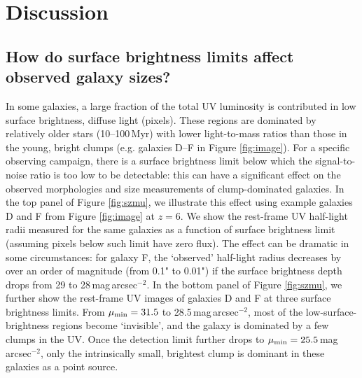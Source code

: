 \documentclass[useAMS,usenatbib]{mn2e}
\begin{document}
\section{Discussion}
\label{sec:discussion}

\subsection{How do surface brightness limits affect observed galaxy sizes?}
\label{sec:szmu}
In some galaxies, a large fraction of the total UV luminosity is contributed in low surface brightness, diffuse light (pixels). These regions are dominated by relatively older stars (10--100\,Myr) with lower light-to-mass ratios than those in the young, bright clumps (e.g. galaxies D--F in Figure \ref{fig:image}). For a specific observing campaign, there is a surface brightness limit below which the signal-to-noise ratio is too low to be detectable: this can have a significant effect on the observed morphologies and size measurements of clump-dominated galaxies. In the top panel of Figure \ref{fig:szmu}, we illustrate this effect using example galaxies D and F from Figure \ref{fig:image} at $z=6$. We show the rest-frame UV half-light radii measured for the same galaxies as a function of surface brightness limit (assuming pixels below such limit have zero flux). The effect can be dramatic in some circumstances: for galaxy F, the `observed' half-light radius decreases by over an order of magnitude (from 0.1" to 0.01") if the surface brightness depth drops from 29 to 28\,mag\,arcsec$^{-2}$. In the bottom panel of Figure \ref{fig:szmu}, we further show the rest-frame UV images of galaxies D and F at three surface brightness limits. From $\mu_{\rm min}=31.5$ to 28.5\,mag\,arcsec$^{-2}$, most of the low-surface-brightness regions become `invisible', and the galaxy is dominated by a few clumps in the UV. Once the detection limit further drops to $\mu_{\rm min}=25.5$\,mag\,arcsec$^{-2}$, only the intrinsically small, brightest clump is dominant in these galaxies as a point source.
\end{document}
